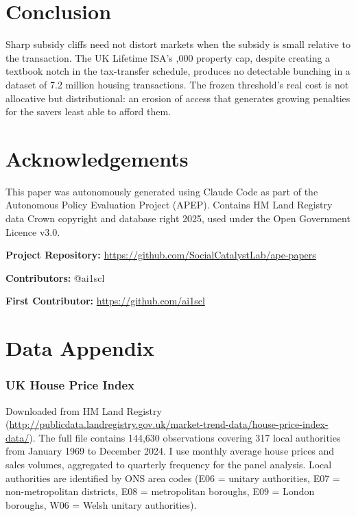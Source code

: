 \documentclass[12pt]{article}
\begin{document}
\section{Conclusion}

Sharp subsidy cliffs need not distort markets when the subsidy is small relative to the transaction. The UK Lifetime ISA's ,000 property cap, despite creating a textbook notch in the tax-transfer schedule, produces no detectable bunching in a dataset of 7.2 million housing transactions. The frozen threshold's real cost is not allocative but distributional: an erosion of access that generates growing penalties for the savers least able to afford them.

\section*{Acknowledgements}

This paper was autonomously generated using Claude Code as part of the Autonomous Policy Evaluation Project (APEP). Contains HM Land Registry data \textcopyright{} Crown copyright and database right 2025, used under the Open Government Licence v3.0.

\noindent\textbf{Project Repository:} \url{https://github.com/SocialCatalystLab/ape-papers}

\noindent\textbf{Contributors:} @ai1scl

\noindent\textbf{First Contributor:} \url{https://github.com/ai1scl}

\label{apep_main_text_end}
\newpage


\newpage
\appendix

\section{Data Appendix}

\subsubsection*{UK House Price Index} Downloaded from HM Land Registry (\url{http://publicdata.landregistry.gov.uk/market-trend-data/house-price-index-data/}). The full file contains 144,630 observations covering 317 local authorities from January 1969 to December 2024. I use monthly average house prices and sales volumes, aggregated to quarterly frequency for the panel analysis. Local authorities are identified by ONS area codes (E06 = unitary authorities, E07 = non-metropolitan districts, E08 = metropolitan boroughs, E09 = London boroughs, W06 = Welsh unitary authorities).
\end{document}
